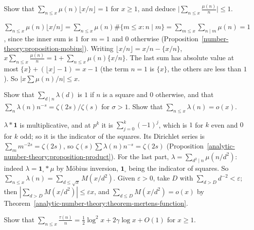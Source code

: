 \begin{exercise}\label{analytic-number-theory:exercise-mu-over-n}
Show that $\sum_{n \leq x}\mu(n)\lfloor x/n\rfloor = 1$ for $x \geq 1$, and deduce $\bigl|\sum_{n \leq x}\frac{\mu(n)}{n}\bigr| \leq 1$.
\end{exercise}

\begin{solution}
$\sum_{n \leq x}\mu(n)\lfloor x/n\rfloor = \sum_{n \leq x}\mu(n)\#\{m \leq x : n \mid m\} = \sum_{m \leq x}\sum_{n \mid m}\mu(n) = 1$, since the inner sum is $1$ for $m = 1$ and $0$ otherwise
(Proposition~\ref{number-theory:proposition-mobius}). Writing $\lfloor x/n\rfloor = x/n - \{x/n\}$, $x\sum_{n \leq x}\frac{\mu(n)}{n} = 1 + \sum_{n \leq x}\mu(n)\{x/n\}$. The last sum has absolute value at most
$\{x\} + (\lfloor x\rfloor - 1) = x - 1$ (the term $n = 1$ is $\{x\}$, the others are less than $1$). So $|x\sum\mu(n)/n| \leq x$.
\end{solution}

\begin{exercise}\label{analytic-number-theory:exercise-liouville}
Show that $\sum_{d \mid n}\lambda(d)$ is $1$ if $n$ is a square and $0$ otherwise, and that $\sum_n\lambda(n)n^{-s} = \zeta(2s)/\zeta(s)$ for $\sigma > 1$. Show that $\sum_{n \leq x}\lambda(n) = o(x)$.
\end{exercise}

\begin{solution}
$\lambda * \mathbf{1}$ is multiplicative, and at $p^k$ it is $\sum_{j=0}^k(-1)^j$, which is $1$ for $k$ even and $0$ for $k$ odd; so it is the indicator of the squares. Its Dirichlet series is
$\sum_mm^{-2s} = \zeta(2s)$, so $\zeta(s)\sum\lambda(n)n^{-s} = \zeta(2s)$ (Proposition~\ref{analytic-number-theory:proposition-product}). For the last part, $\lambda = \sum_{d^2 \mid n}\mu(n/d^2)$: indeed
$\lambda = \mathbf{1}_{\square} * \mu$ by Möbius inversion, $\mathbf{1}_\square$ being the indicator of squares. So $\sum_{n \leq x}\lambda(n) = \sum_{d \leq \sqrt{x}}M(x/d^2)$. Given $\varepsilon > 0$, take $D$
with $\sum_{d > D}d^{-2} < \varepsilon$; then $|\sum_{d > D}M(x/d^2)| \leq \varepsilon x$, and $\sum_{d \leq D}M(x/d^2) = o(x)$ by Theorem~\ref{analytic-number-theory:theorem-mertens-function}.
\end{solution}

\begin{exercise}\label{analytic-number-theory:exercise-divisor-log}
Show that $\sum_{n \leq x}\frac{\tau(n)}{n} = \frac12\log^2x + 2\gamma\log x + O(1)$ for $x \geq 1$.
\end{exercise}

